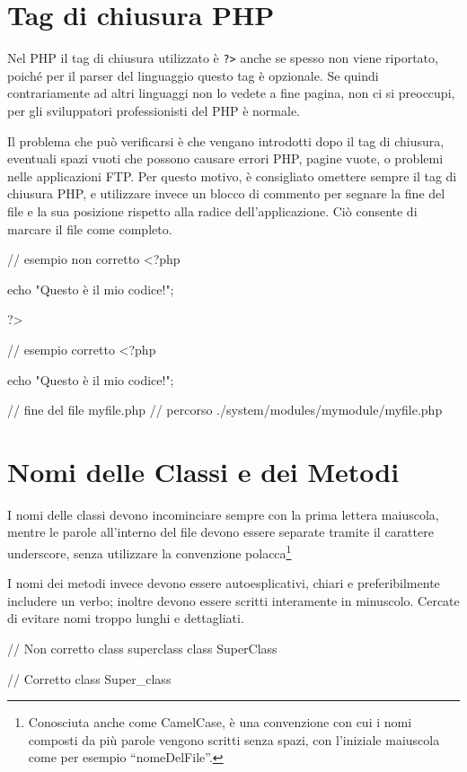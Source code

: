 \section*{Tag di chiusura PHP}
Nel PHP il tag di chiusura utilizzato è \verb|?>| anche se spesso non viene riportato, poiché per il parser del linguaggio questo tag è opzionale. Se quindi contrariamente ad altri linguaggi non lo vedete a fine pagina, non ci si preoccupi, per gli sviluppatori professionisti del PHP è normale.

Il problema che può verificarsi è che vengano introdotti dopo il tag di chiusura, eventuali spazi vuoti che possono causare errori PHP, pagine vuote, o problemi nelle applicazioni \ac{FTP}. Per questo motivo, è consigliato omettere sempre il tag di chiusura PHP, e utilizzare invece un blocco di commento per segnare la fine del file e la sua posizione rispetto alla radice dell'applicazione. Ciò consente di marcare il file come completo.

\begin{code}
// esempio non corretto
<?php

echo "Questo è il mio codice!";

?>

// esempio corretto
<?php

echo "Questo è il mio codice!";

// fine del file myfile.php
// percorso ./system/modules/mymodule/myfile.php
\end{code}

\section*{Nomi delle Classi e dei Metodi}
I nomi delle classi devono incominciare sempre con la prima lettera maiuscola, mentre le parole all'interno del file devono essere separate tramite il carattere underscore, senza utilizzare la convenzione polacca\footnote{Conosciuta anche come CamelCase, è una convenzione con cui i nomi composti da più parole vengono scritti senza spazi, con l'iniziale maiuscola come per esempio ``nomeDelFile''.}

I nomi dei metodi invece devono essere autoesplicativi, chiari e preferibilmente includere un verbo; inoltre devono essere scritti interamente in minuscolo. Cercate di evitare nomi troppo lunghi e dettagliati.

\begin{code}
// Non corretto
class superclass
class SuperClass

// Corretto
class Super_class
\end{code}


